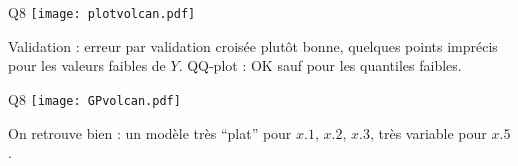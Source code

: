 \documentclass{beamer}
\begin{document}
\begin{frame}[fragile]{Q8}
\texttt{[image: plotvolcan.pdf]} 

Validation : erreur par validation croisée plutôt bonne, quelques points imprécis pour les valeurs faibles de $Y$. QQ-plot : OK sauf pour les quantiles faibles.

\end{frame}
\begin{frame}[fragile]{Q8}
\texttt{[image: GPvolcan.pdf]} 

On retrouve bien : un modèle très ``plat'' pour $x.1$, $x.2$, $x.3$, très variable pour $x.5$.
\end{frame}
\end{document}
